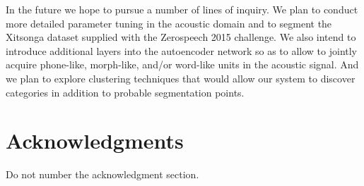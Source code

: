 \documentclass[11pt,letterpaper]{article}
\begin{document}
In the future we hope to pursue a number of lines of inquiry.
We plan to conduct more detailed parameter tuning in the acoustic domain and to segment the Xitsonga dataset supplied with the Zerospeech 2015 challenge.
We also intend to introduce additional layers into the autoencoder network so as to allow to jointly acquire phone-like, morph-like, and/or word-like units in the acoustic signal.
And we plan to explore clustering techniques that would allow our system to discover categories in addition to probable segmentation points.

\section*{Acknowledgments}

Do not number the acknowledgment section.



\end{document}
